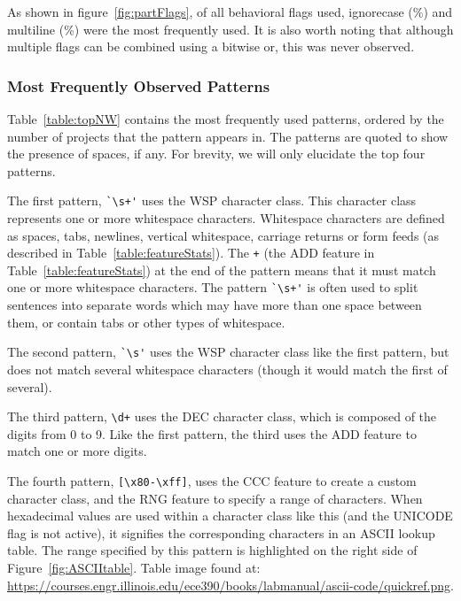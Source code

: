  As shown in figure~\ref{fig:partFlags}, of all behavioral flags used, ignorecase (\%) and multiline (\%) were the most frequently used.  It is also worth noting that although multiple flags can be combined using a bitwise or, this was never observed.


\subsubsection{Most Frequently Observed Patterns}

Table~\ref{table:topNW} contains the most frequently used patterns, ordered by the number of projects that the pattern appears in.  The patterns are quoted to show the presence of spaces, if any.  For brevity, we will only elucidate the top four patterns.

The first pattern, \verb!`\s+'! uses the WSP character class.  This character class represents one or more whitespace characters.  Whitespace characters are defined as spaces, tabs, newlines, vertical whitespace, carriage returns or form feeds (as described in Table~\ref{table:featureStats}).  The \verb!+! (the ADD feature in Table~\ref{table:featureStats}) at the end of the pattern means that it must match one or more whitespace characters.  The pattern \verb!`\s+'! is often used to split sentences into separate words which may have more than one space between them, or contain tabs or other types of whitespace.

The second pattern, \verb!`\s'! uses the WSP character class like the first pattern, but does not match several whitespace characters (though it would match the first of several).

The third pattern, \verb!\d+! uses the DEC character class, which is composed of the digits from 0 to 9.  Like the first pattern, the third uses the ADD feature to match one or more digits.

The fourth pattern, \verb![\x80-\xff]!, uses the CCC feature to create a custom character class, and the RNG feature to specify a range of characters.
When hexadecimal values are used within a character class like this (and the UNICODE flag is not active), it signifies the corresponding characters in an ASCII lookup table.  The range specified by this pattern is highlighted on the right side of Figure~\ref{fig:ASCIItable}.  Table image found at: \url{https://courses.engr.illinois.edu/ece390/books/labmanual/ascii-code/quickref.png}.

